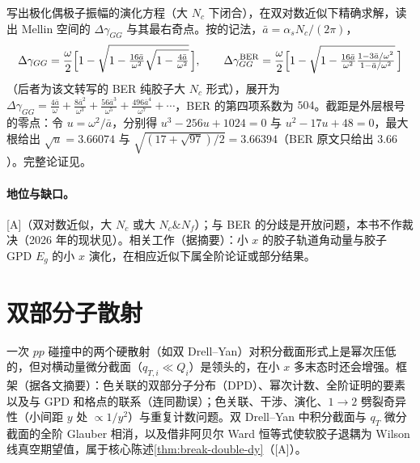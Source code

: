 \begin{proofsketch}
写出极化偶极子振幅的演化方程（大 $N_c$ 下闭合），在双对数近似下精确求解，读出 Mellin 空间的 $\Delta\gamma_{GG}$ 与其最右奇点。按\cite{Borden:2023ugd}的记法，$\bar a=\alpha_sN_c/(2\pi)$，
\begin{equation}\label{eq:front-dgamma}
\Delta\gamma_{GG}=\frac\omega2\Bigl[1-\sqrt{1-\tfrac{16\bar a}{\omega^2}\sqrt{1-\tfrac{4\bar a}{\omega^2}}}\,\Bigr],\qquad
\Delta\gamma_{GG}^{\rm BER}=\frac\omega2\Bigl[1-\sqrt{1-\tfrac{16\bar a}{\omega^2}\tfrac{1-3\bar a/\omega^2}{1-\bar a/\omega^2}}\,\Bigr]
\end{equation}
（后者为该文转写的 BER 纯胶子大 $N_c$ 形式），展开为 $\Delta\gamma_{GG}=\frac{4\bar a}\omega+\frac{8\bar a^2}{\omega^3}+\frac{56\bar a^3}{\omega^5}+\frac{496\bar a^4}{\omega^7}+\cdots$，BER 的第四项系数为 $504$。截距是外层根号的零点：令 $u=\omega^2/\bar a$，分别得 $u^3-256u+1024=0$ 与 $u^2-17u+48=0$，最大根给出 $\sqrt u=3.66074$ 与 $\sqrt{(17+\sqrt{97})/2}=3.66394$（BER 原文只给出 $3.66$）。完整论证见\cite{Borden:2023ugd,Borden:2025ehe}。
\end{proofsketch}

\paragraph{地位与缺口。}[A]（双对数近似，大 $N_c$ 或大 $N_c\&N_f$）；与 BER 的分歧是开放问题，本书不作裁决（2026 年的现状见\cite{Borden:2025ehe}）。相关工作（据摘要）：小 $x$ 的胶子轨道角动量\cite{Hatta:2016aoc}与胶子 GPD $E_g$ 的小 $x$ 演化\cite{Hatta:2022bxn}，在相应近似下属全阶论证或部分结果。

\section{双部分子散射}\label{sec:front-dps}

一次 $pp$ 碰撞中的两个硬散射（如双 Drell--Yan）对积分截面形式上是幂次压低的，但对横动量微分截面（$q_{T,i}\ll Q_i$）是领头的，在小 $x$ 多末态时还会增强。框架（据各文摘要）：色关联的双部分子分布（DPD）、幂次计数、全阶证明的要素以及与 GPD 和格点的联系\cite{DiehlOstermeierSchafer2012}（连同勘误）；色关联、干涉、演化、$1\to2$ 劈裂奇异性（小间距 $y$ 处 $\propto1/y^2$）与重复计数问题\cite{Manohar:2012jr,Manohar:2012pe}。双 Drell--Yan 中积分截面与 $q_T$ 微分截面的全阶 Glauber 相消\cite{Diehl:2015bca}，以及借非阿贝尔 Ward 恒等式使软胶子退耦为 Wilson 线真空期望值\cite{Diehl:2018wfy}，属于核心陈述\cref{thm:break-double-dy}（[A]）。

